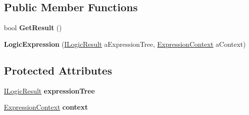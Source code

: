\subsection*{Public Member Functions}
\begin{DoxyCompactItemize}
\item 
bool {\bfseries Get\+Result} ()\hypertarget{class_b83_1_1_logic_expression_parser_1_1_logic_expression_ab8b3f3a5e40d92147bd2aeef9b701d06}{}\label{class_b83_1_1_logic_expression_parser_1_1_logic_expression_ab8b3f3a5e40d92147bd2aeef9b701d06}

\item 
{\bfseries Logic\+Expression} (\hyperlink{interface_b83_1_1_logic_expression_parser_1_1_i_logic_result}{I\+Logic\+Result} a\+Expression\+Tree, \hyperlink{class_b83_1_1_logic_expression_parser_1_1_expression_context}{Expression\+Context} a\+Context)\hypertarget{class_b83_1_1_logic_expression_parser_1_1_logic_expression_afa4ed4cb6125e11759605f07ec5a51a5}{}\label{class_b83_1_1_logic_expression_parser_1_1_logic_expression_afa4ed4cb6125e11759605f07ec5a51a5}

\end{DoxyCompactItemize}
\subsection*{Protected Attributes}
\begin{DoxyCompactItemize}
\item 
\hyperlink{interface_b83_1_1_logic_expression_parser_1_1_i_logic_result}{I\+Logic\+Result} {\bfseries expression\+Tree}\hypertarget{class_b83_1_1_logic_expression_parser_1_1_logic_expression_a3501f33bced1d9132379b42dacd0dbab}{}\label{class_b83_1_1_logic_expression_parser_1_1_logic_expression_a3501f33bced1d9132379b42dacd0dbab}

\item 
\hyperlink{class_b83_1_1_logic_expression_parser_1_1_expression_context}{Expression\+Context} {\bfseries context}\hypertarget{class_b83_1_1_logic_expression_parser_1_1_logic_expression_a453f73486a0445e8f01ea189895e99e6}{}\label{class_b83_1_1_logic_expression_parser_1_1_logic_expression_a453f73486a0445e8f01ea189895e99e6}

\end{DoxyCompactItemize}
